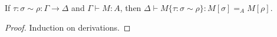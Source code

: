 \begin{prop}
If $\tau : \sigma \sim \rho : \Gamma \rightarrow \Delta$ and $\Gamma \vdash M : A$,
then $\Delta \vdash M \{ \tau : \sigma \sim \rho \} : M [ \sigma ] =_A M [ \rho ]$.
\end{prop}

\begin{proof}
Induction on derivations.
\end{proof}

\begin{code}%
\> \AgdaSymbol{:}  \AgdaSymbol{\{}\AgdaSymbol{\}} \AgdaSymbol{\{}\AgdaSymbol{\}} \AgdaSymbol{\{} \AgdaSymbol{:}  \AgdaSymbol{\}} \AgdaSymbol{\{} \AgdaSymbol{:}  \AgdaSymbol{\}} \<[62]%
\>[62]\<%
\\
\>[0]\<[2]%
\>[2]\AgdaSymbol{\{}\AgdaSymbol{\}} \AgdaSymbol{\{}\AgdaSymbol{\}} \AgdaSymbol{\{}\AgdaSymbol{\}} \AgdaSymbol{\{}\AgdaSymbol{\}} \AgdaSymbol{\{}\AgdaSymbol{\}} \<%
\\
\>[0]\<[2]%
\>[2]\AgdaSymbol{(}    \AgdaSymbol{)}  \AgdaSymbol{(}        \AgdaSymbol{)} \<%
\\
\>[0]\<[2]%
\>[2]\AgdaSymbol{(}    \AgdaSymbol{)}  \AgdaSymbol{(}    \AgdaSymbol{)}  \<[30]%
\>[30]\<%
\\
\>[0]\<[2]%
\>[2]   \<[12]%
\>[12]\<%
\\
\>[0]\<[2]%
\>[2]                      \<%
\end{code}

